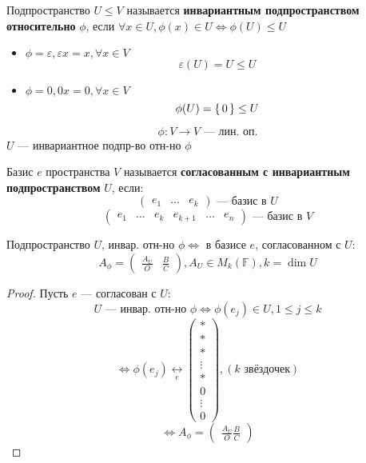\begin{definition}
  Подпространство $U \leq V$ называется \textbf{инвариантным подпространством относительно} $\phi$, если $\forall x \in U, \phi(x) \in U \iff \phi(U) \leq U$
\end{definition}
\begin{example}
  \begin{itemize}
    \item $\phi = \varepsilon, \varepsilon x = x, \forall x \in V$
      \[
      \varepsilon(U) = U \leq U
      \]
    \item $\phi = 0, 0x = 0, \forall x \in V$
      \[
      \phi(U) = \set{0} \leq U
      \]
  \end{itemize}
\end{example}
\[
\phi \colon V \rightarrow V \text{ --- лин. оп.}
\]
$U$ --- инвариантное подпр-во отн-но $\phi$
\begin{definition}
  Базис $e$ пространства $V$ называется \textbf{согласованным с инвариантным подпространством} $U$, если:
  \[
    \begin{pmatrix} e_1 & \ldots & e_k \end{pmatrix} \text{ --- базис в $U$}
  \]
  \[
    \begin{pmatrix} e_1 & \ldots & e_k & e_{k + 1} & \ldots & e_n \end{pmatrix} \text{ --- базис в $V$}
  \]
\end{definition}
\begin{statement}
  \label{statement:03_3}
  Подпространство $U$, инвар. отн-но $\phi \iff $ в базисе $e$, согласованном с $U$:
  \[
    A_\phi = \begin{pmatrix}\frac{A_U}{O} & \frac{B}{C} \end{pmatrix}, A_U \in M_k(\mathbb{F}), k = \dim U
  \]
\end{statement}
\begin{proof}
  Пусть $e$ --- согласован с $U$:
  \[
  U \text{ --- инвар. отн-но $\phi$} \iff \phi(e_j) \in U, 1 \leq j \leq k
  \]
  \[
  \iff \phi(e_j) \underset{e}{\longleftrightarrow} \begin{pmatrix} * \\ * \\ * \\ \vdots \\ * \\ 0 \\ \vdots \\ 0 \end{pmatrix}, (k \text{ звёздочек})
  \]
  \[
  \iff A_\phi = \begin{pmatrix} \frac{A_U}{O} \frac{B}{C} \end{pmatrix}
  \]
\end{proof}
